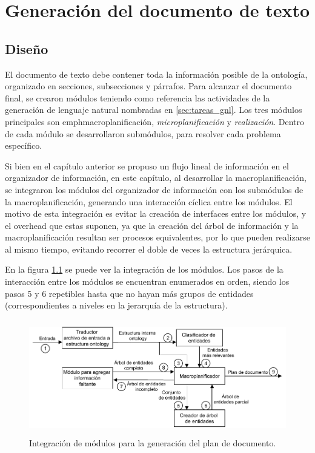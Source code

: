 \chapter{Generación del documento de texto}

\section{Diseño}
El documento de texto debe contener toda la información posible de la ontología, organizado en secciones, subsecciones y párrafos. Para alcanzar el documento final, se crearon módulos teniendo como referencia las actividades de la generación de lenguaje natural nombradas en \ref{sec:tareas_gnl}. Los tres módulos principales son emph{macroplanificación}, \emph{microplanificación} y \emph{realización}. Dentro de cada módulo se desarrollaron submódulos, para resolver cada problema específico. 

Si bien en el capítulo anterior se propuso un flujo lineal de información en el organizador de información, en este capítulo, al desarrollar la macroplanificación, se integraron los módulos del organizador de información con los submódulos de la macroplanificación, generando una interacción cíclica entre los módulos. El motivo de esta integración es evitar la creación de interfaces entre los módulos, y el overhead que estas suponen, ya que la creación del árbol de información y la macroplanificación resultan ser procesos equivalentes, por lo que pueden realizarse al mismo tiempo, evitando recorrer el doble de veces la estructura jerárquica. 

En la figura \ref{fig:modulos_plan_documento} se puede ver la integración de los módulos. Los pasos de la interacción entre los módulos se encuentran enumerados en orden, siendo los pasos 5 y 6 repetibles hasta que no hayan más grupos de entidades (correspondientes a niveles en la jerarquía de la estructura).

\begin{figure}[H]
    \centering
    \includegraphics[width=12cm, height=5cm]{img/generacion_documento/modulos_plan_documento.pdf}
    \caption{Integración de módulos para la generación del plan de documento.}
    \label{fig:modulos_plan_documento}
\end{figure}

